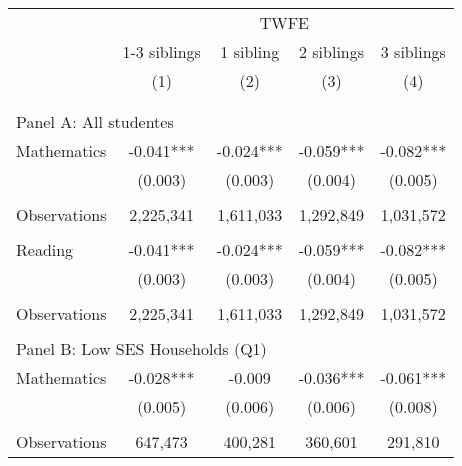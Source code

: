 \makeatletter
{}
{
\makeatother
\begin{tabular}{lcccc}
\toprule
\cmidrule(lr){2-5}
& \multicolumn{4}{c}{TWFE} \\
\cmidrule(lr){2-5}
& 1-3 siblings & 1 sibling & 2 siblings & 3 siblings  \\
\cmidrule(lr){2-2} \cmidrule(lr){3-3} \cmidrule(lr){4-4} \cmidrule(lr){5-5}
& (1) & (2) & (3) & (4) \\
\bottomrule
&  &  & &  \\
&  &  & &  \\
\multicolumn{5}{l}{Panel A: All studentes } \\
Mathematics         &      -0.041***&      -0.024***&      -0.059***&      -0.082***\\
                    &     (0.003)   &     (0.003)   &     (0.004)   &     (0.005)   \\
                    &               &               &               &               \\
Observations        &   2,225,341   &   1,611,033   &   1,292,849   &   1,031,572   \\
 
&  &  & &  \\
Reading             &      -0.041***&      -0.024***&      -0.059***&      -0.082***\\
                    &     (0.003)   &     (0.003)   &     (0.004)   &     (0.005)   \\
                    &               &               &               &               \\
Observations        &   2,225,341   &   1,611,033   &   1,292,849   &   1,031,572   \\
 
&  &  & &  \\
\multicolumn{5}{l}{Panel B: Low SES Households (Q1)} \\
Mathematics         &      -0.028***&      -0.009   &      -0.036***&      -0.061***\\
                    &     (0.005)   &     (0.006)   &     (0.006)   &     (0.008)   \\
                    &               &               &               &               \\
Observations        &     647,473   &     400,281   &     360,601   &     291,810   \\
 

\end{tabular}}
